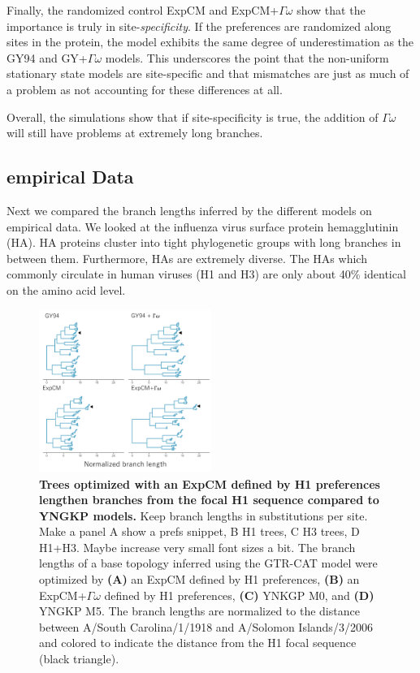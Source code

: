 \documentclass[11pt]{article}
\newcommand\jdbcomment[1]{{\color{red}#1}}
\begin{document}
Finally, the randomized control ExpCM and ExpCM+$\Gamma\omega$ show that the importance is truly in site-\textit{specificity}. 
If the preferences are randomized along sites in the protein, the model exhibits the same degree of underestimation as the GY94 and GY+$\Gamma\omega$ models. 
This underscores the point that the non-uniform stationary state models are site-specific and that mismatches are just as much of a problem as not accounting for these differences at all. 

Overall, the simulations show that if site-specificity is true, the addition of $\Gamma\omega$ will still have problems at extremely long branches. 

\subsection*{empirical Data}

Next we compared the branch lengths inferred by the different models on empirical data. 
We looked at the influenza virus surface protein hemagglutinin (HA). 
HA proteins cluster into tight phylogenetic groups with long branches in between them. 
Furthermore, HAs are extremely diverse. 
The HAs which commonly circulate in human viruses (H1 and H3) are only about 40\% identical on the amino acid level. 

\begin{figure}[H]
\centerline{\includegraphics[width=0.5\textwidth]{figures/tree_doud}}
\caption{\label{fig:tree_doud}
\textbf{Trees optimized with an ExpCM defined by H1 preferences lengthen branches from the focal H1 sequence compared to YNGKP models.} 
\jdbcomment{Keep branch lengths in substitutions per site. Make a panel A show a prefs snippet, B H1 trees, C H3 trees, D H1+H3. Maybe increase very small font sizes a bit.}
The branch lengths of a base topology inferred using the GTR-CAT model were optimized by \textbf{(A)} an ExpCM defined by H1 preferences, \textbf{(B)} an ExpCM+$\Gamma\omega$ defined by H1 preferences, \textbf{(C)} YNKGP M0, and \textbf{(D)} YNGKP M5.
The branch lengths are normalized to the distance between A/South Carolina/1/1918 and A/Solomon Islands/3/2006 and colored to indicate the distance from the H1 focal sequence (black triangle).
}
\end{figure}
\end{document}
